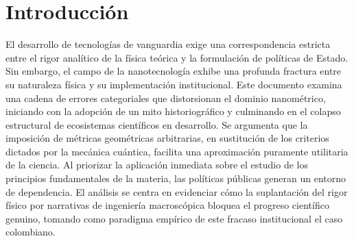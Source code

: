 \section{Introducción}

El desarrollo de tecnologías de vanguardia exige una correspondencia estricta
entre el rigor analítico de la física teórica y la formulación de políticas de
Estado. Sin embargo, el campo de la nanotecnología exhibe una profunda fractura
entre su naturaleza física y su implementación institucional. Este
documento examina una cadena de errores categoriales que distorsionan el dominio
nanométrico, iniciando con la adopción de un mito historiográfico y culminando
en el colapso estructural de ecosistemas científicos en desarrollo. Se
argumenta que la imposición de métricas geométricas arbitrarias, en sustitución
de los criterios dictados por la mecánica cuántica, facilita una aproximación
puramente utilitaria de la ciencia. Al priorizar la aplicación
inmediata sobre el estudio de los principios fundamentales de la materia, las
políticas públicas generan un entorno de dependencia. El análisis se
centra en evidenciar cómo la suplantación del rigor físico por narrativas de
ingeniería macroscópica bloquea el progreso científico genuino, tomando como
paradigma empírico de este fracaso institucional el caso colombiano.
